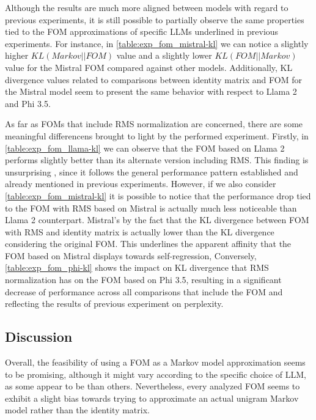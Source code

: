 Although the results are much more aligned between models with regard to previous experiments, it is still possible to partially observe the same properties tied to the FOM approximations of specific LLMs underlined in previous experiments.
For instance, in \cref{table:exp_fom_mistral-kl} we can notice a slightly higher $KL(Markov||FOM)$  value and a slightly lower $KL(FOM||Markov)$  value for the Mistral FOM compared against other models.
Additionally, KL divergence values related to comparisons between identity matrix and FOM for the Mistral model seem to present the same behavior with respect to Llama 2 and Phi 3.5.

As far as FOMs that include RMS normalization are concerned, there are some meaningful differencens brought to light by the performed experiment.
Firstly, in \cref{table:exp_fom_llama-kl} we can observe that the FOM based on Llama 2 performs slightly better than its alternate version including RMS.
This finding is unsurprising , since it follows the general performance pattern established and already mentioned in previous experiments.
However, if we also consider \cref{table:exp_fom_mistral-kl} it is possible to notice that the performance drop tied to the FOM with RMS based on Mistral is actually much less noticeable than  Llama 2 counterpart.
Mistral's  by the fact that the KL divergence between FOM with RMS and identity matrix is actually lower than the KL divergence considering the original FOM.
This underlines the apparent affinity that the FOM based on Mistral displays towards self-regression,
Conversely, \cref{table:exp_fom_phi-kl} shows the  impact on KL divergence that RMS normalization has on the FOM based  on Phi 3.5, resulting in a significant decrease of performance across all comparisons that include the FOM and reflecting the results of  previous experiment on perplexity.

\subsection{Discussion}\label{ssec:exp_fom_discussion}

Overall, the feasibility of using a FOM as a Markov model approximation seems to be promising, although it might vary according to the specific choice of LLM, as some appear to be  than others.
Nevertheless, every analyzed FOM seems to exhibit a slight bias towards trying to approximate an actual unigram Markov model rather than the identity matrix.

